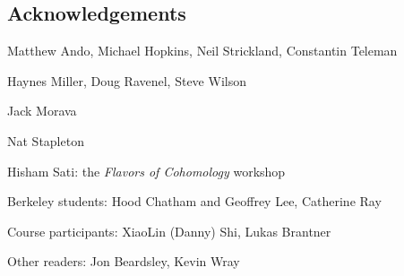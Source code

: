 
\subsection*{Acknowledgements}

Matthew Ando, Michael Hopkins, Neil Strickland, Constantin Teleman

Haynes Miller, Doug Ravenel, Steve Wilson

Jack Morava

Nat Stapleton



Hisham Sati: the \textit{Flavors of Cohomology} workshop

Berkeley students: Hood Chatham and Geoffrey Lee, Catherine Ray

Course participants: XiaoLin (Danny) Shi, Lukas Brantner

Other readers: Jon Beardsley, Kevin Wray
